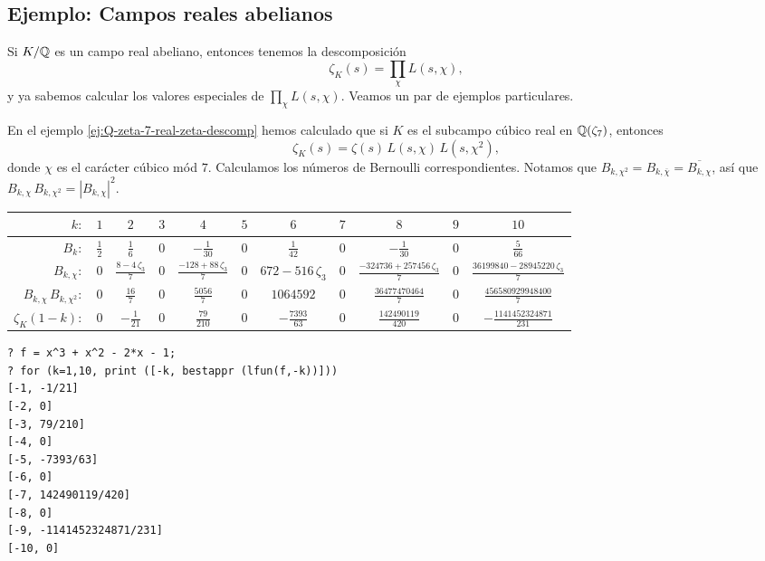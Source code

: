 \subsection{Ejemplo: Campos reales abelianos}

Si $K/\mathbb{Q}$ es un campo real abeliano, entonces tenemos la descomposición
$$\zeta_K (s) = \prod_\chi L (s,\chi),$$
y ya sabemos calcular los valores especiales de $\prod_\chi L (s,\chi)$.
Veamos un par de ejemplos particulares.

\begin{ejemplo}
  En el ejemplo \ref{ej:Q-zeta-7-real-zeta-descomp} hemos calculado que si $K$
  es el subcampo cúbico real en $\mathbb{Q} (\zeta_7)$, entonces
  $$\zeta_K (s) = \zeta (s) \, L (s,\chi) \, L (s,\chi^2),$$
  donde $\chi$ es el carácter cúbico mód $7$. Calculamos los números de
  Bernoulli correspondientes. Notamos que
  $B_{k,\chi^2} = B_{k,\overline{\chi}} = \overline{B_{k,\chi}}$, así que
  $B_{k,\chi}\,B_{k,\chi^2} = |B_{k,\chi}|^2$.

  \begin{center}
    \renewcommand{\arraystretch}{1.5}
    \begin{tabular}{rcccccccccc}
      \hline
      $k\colon$ & $1$ & $2$ & $3$ & $4$ & $5$ & $6$ & $7$ & $8$ & $9$ & $10$ \\
      \hline
      $B_k\colon$ & $\frac{1}{2}$ & $\frac{1}{6}$ & $0$ & $-\frac{1}{30}$ & $0$ & $\frac{1}{42}$ & $0$ & $-\frac{1}{30}$ & $0$ & $\frac{5}{66}$ \\
      \hline
      $B_{k,\chi}\colon$ & $0$ & $\frac{8-4\,\zeta_3}{7}$ & $0$ & $\frac{-128 + 88\,\zeta_3}{7}$ & $0$ & $672 - 516\,\zeta_3$ & $0$ & $\frac{-324736 + 257456\,\zeta_3}{7}$ & $0$ & $\frac{36199840 - 28945220\,\zeta_3}{7}$ \\
      \hline
      $B_{k,\chi}\,B_{k,\chi^2}\colon$ & $0$ & $\frac{16}{7}$ & $0$ & $\frac{5056}{7}$ & $0$ & $1064592$ & $0$ & $\frac{36477470464}{7}$ & $0$ & $\frac{456580929948400}{7}$ \\
      \hline
      $\zeta_K (1-k)\colon$ & $0$ & $-\frac{1}{21}$ & $0$ & $\frac{79}{210}$ & $0$ & $-\frac{7393}{63}$ & $0$ & $\frac{142490119}{420}$ & $0$ & $-\frac{1141452324871}{231}$ \\
      \hline
    \end{tabular}
  \end{center}

  \begin{shaded}
\begin{verbatim}
? f = x^3 + x^2 - 2*x - 1;
? for (k=1,10, print ([-k, bestappr (lfun(f,-k))]))
[-1, -1/21]
[-2, 0]
[-3, 79/210]
[-4, 0]
[-5, -7393/63]
[-6, 0]
[-7, 142490119/420]
[-8, 0]
[-9, -1141452324871/231]
[-10, 0]
\end{verbatim}
\end{shaded}
\end{ejemplo}

